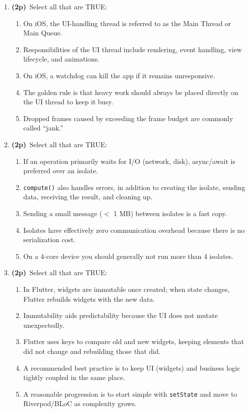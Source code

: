 \documentclass[11pt]{article}
\newcommand{\pts}{\textbf{(2p)}~}
\begin{document}
\begin{enumerate}
    \item \pts Select all that are TRUE:
    \begin{enumerate}
      \item On iOS, the UI-handling thread is referred to as the Main Thread or Main Queue.
      \item Responsibilities of the UI thread include rendering, event handling, view lifecycle, and animations.
      \item On iOS, a watchdog can kill the app if it remains unresponsive.
      \item The golden rule is that heavy work should always be placed directly on the UI thread to keep it busy.
      \item Dropped frames caused by exceeding the frame budget are commonly called ``jank.''
    \end{enumerate}

    \item \pts Select all that are TRUE:
    \begin{enumerate}
      \item If an operation primarily waits for I/O (network, disk), async/await is preferred over an isolate.
      \item \texttt{compute()} also handles errors, in addition to creating the isolate, sending data, receiving the result, and cleaning up.
      \item Sending a small message ($<$ 1 MB) between isolates is a fast copy.
      \item Isolates have effectively zero communication overhead because there is no serialization cost.
      \item On a 4-core device you should generally not run more than 4 isolates.
    \end{enumerate}

    \item \pts Select all that are TRUE:
    \begin{enumerate}
      \item In Flutter, widgets are immutable once created; when state changes, Flutter rebuilds widgets with the new data.
      \item Immutability aids predictability because the UI does not mutate unexpectedly.
      \item Flutter uses keys to compare old and new widgets, keeping elements that did not change and rebuilding those that did.
      \item A recommended best practice is to keep UI (widgets) and business logic tightly coupled in the same place.
      \item A reasonable progression is to start simple with \texttt{setState} and move to Riverpod/BLoC as complexity grows.
    \end{enumerate}


\end{enumerate}
\end{document}

